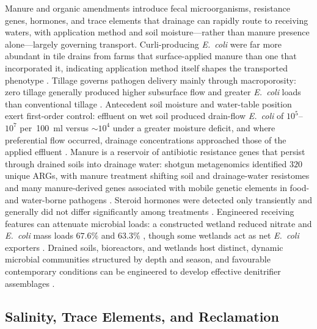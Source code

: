 \documentclass[11pt]{article}
\begin{document}
Manure and organic amendments introduce fecal microorganisms, resistance
genes, hormones, and trace elements that drainage can rapidly route to
receiving waters, with application method and soil moisture---rather than
manure presence alone---largely governing transport. Curli-producing
\textit{E.\ coli} were far more abundant in tile drains from farms that
surface-applied manure than one that incorporated it, indicating application
method itself shapes the transported phenotype \parencite{Truhlar2015}.
Tillage governs pathogen delivery mainly through macroporosity: zero tillage
generally produced higher subsurface flow and greater \textit{E.\ coli} loads
than conventional tillage \parencite{Thiagarajan2007,Jenkins2009}. Antecedent
soil moisture and water-table position exert first-order control: effluent on
wet soil produced drain-flow \textit{E.\ coli} of $10^{5}$--$10^{7}$
per~100~ml versus $\sim10^{4}$ under a greater moisture deficit, and where
preferential flow occurred, drainage concentrations approached those of the
applied effluent \parencite{Collins2007,Ding2021}. Manure is a reservoir of
antibiotic resistance genes that persist through drained soils into drainage
water: shotgun metagenomics identified $320$ unique ARGs, with manure
treatment shifting soil and drainage-water resistomes and many manure-derived
genes associated with mobile genetic elements in food- and water-borne
pathogens \parencite{Smith2019b}. Steroid hormones were detected only
transiently and generally did not differ significantly among treatments
\parencite{Jenkins2009}. Engineered receiving features can attenuate
microbial loads: a constructed wetland reduced nitrate and \textit{E.\ coli}
mass loads $67.6\%$ and $63.3\%$ \parencite{Haverstock2017}, though some
wetlands act as net \textit{E.\ coli} exporters \parencite{Stott2023}. Drained
soils, bioreactors, and wetlands host distinct, dynamic microbial communities
structured by depth and season, and favourable contemporary conditions can be
engineered to develop effective denitrifier assemblages
\parencite{Andrus2014,Porter2015,Hathaway2015,Knorr2023,Schilling2017}.

\subsection{Salinity, Trace Elements, and Reclamation}
\end{document}
